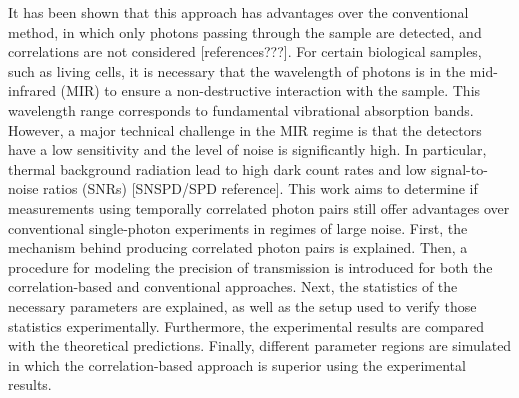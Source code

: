 It has been shown that this approach has advantages over the conventional method, in which only photons passing through the sample are detected, and correlations are not considered [references???].
For certain biological samples, such as living cells, it is necessary that the wavelength of photons is in the mid-infrared (MIR) to ensure a non-destructive interaction with the sample. This wavelength range corresponds to fundamental vibrational absorption bands. \newline
However, a major technical challenge in the MIR regime is that the detectors have a low sensitivity and the level of noise is significantly high. In particular, thermal background radiation lead to high dark count rates and low signal-to-noise ratios (SNRs) [SNSPD/SPD reference]. \newline
This work aims to determine if measurements using temporally correlated photon pairs still offer advantages over conventional single-photon experiments in regimes of large noise. First, the mechanism behind producing correlated photon pairs is explained. Then, a procedure for modeling the precision of transmission is introduced for both the correlation-based and conventional approaches. Next, the statistics of the necessary parameters are explained, as well as the setup used to verify those statistics experimentally. Furthermore, the experimental results are compared with the theoretical predictions. Finally, different parameter regions are simulated in which the correlation-based approach is superior using the experimental results.


